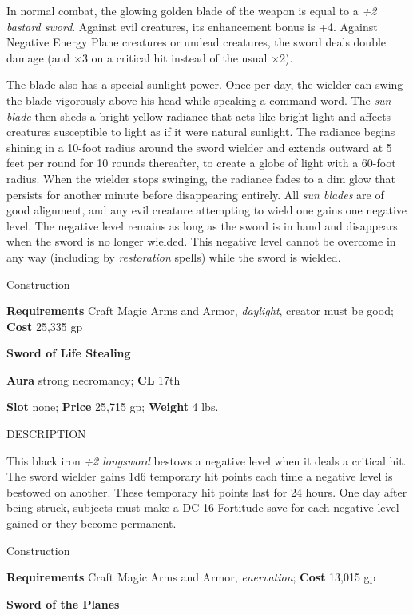 In normal combat, the glowing golden blade of the weapon is equal to a \textit{+2 bastard sword}. Against evil creatures, its enhancement bonus is +4. Against Negative Energy Plane creatures or undead creatures, the sword deals double damage (and \mbox{$\times$}3 on a critical hit instead of the usual \mbox{$\times$}2).
				
The blade also has a special sunlight power. Once per day, the wielder can swing the blade vigorously above his head while speaking a command word. The \textit{sun blade} then sheds a bright yellow radiance that acts like bright light and affects creatures susceptible to light as if it were natural sunlight. The radiance begins shining in a 10-foot radius around the sword wielder and extends outward at 5 feet per round for 10 rounds thereafter, to create a globe of light with a 60-foot radius. When the wielder stops swinging, the radiance fades to a dim glow that persists for another minute before disappearing entirely. All \textit{sun blades} are of good alignment, and any evil creature attempting to wield one gains one negative level. The negative level remains as long as the sword is in hand and disappears when the sword is no longer wielded. This negative level cannot be overcome in any way (including by \textit{restoration} spells) while the sword is wielded. 
				
Construction
				
\textbf{Requirements} Craft Magic Arms and Armor, \textit{daylight}, creator must be good; \textbf{Cost }25,335 gp
				
\textbf{Sword of Life Stealing}
				
\textbf{Aura} strong necromancy;\textbf{ CL }17th
				
\textbf{Slot} none; \textbf{Price} 25,715 gp; \textbf{Weight} 4 lbs.
				
DESCRIPTION
				
This black iron \textit{+2 longsword} bestows a negative level when it deals a critical hit. The sword wielder gains 1d6 temporary hit points each time a negative level is bestowed on another. These temporary hit points last for 24 hours. One day after being struck, subjects must make a DC 16 Fortitude save for each negative level gained or they become permanent. 
				
Construction
				
\textbf{Requirements} Craft Magic Arms and Armor, \textit{enervation}; \textbf{Cost }13,015 gp
				
\textbf{Sword of the Planes}
				
